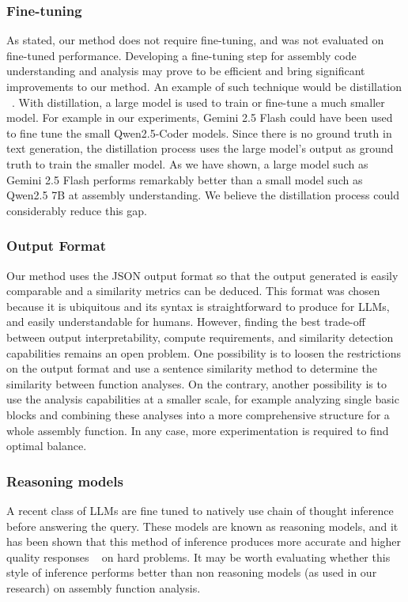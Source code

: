 \subsubsection{Fine-tuning}

As stated, our method does not require fine-tuning, and was not evaluated on fine-tuned performance. Developing a fine-tuning step
for assembly code understanding and analysis may prove to be efficient and bring significant improvements to our method.
An example of such technique would be distillation ~\cite{distillation}. With distillation, a large model is used to train or fine-tune a
much smaller model. For example in our experiments, Gemini 2.5 Flash could have been used to fine tune the small Qwen2.5-Coder models.
Since there is no ground truth in text generation, the distillation process uses the large model's output as ground truth
to train the smaller model. As we have shown, a large model such as Gemini 2.5 Flash performs remarkably better than a
small model such as Qwen2.5 7B at assembly understanding. We believe the distillation process could considerably reduce this gap.

\subsubsection{Output Format}

Our method uses the JSON output format so that the output generated is easily comparable and a similarity metrics can be deduced.
This format was chosen because it is ubiquitous and its syntax is straightforward to produce for LLMs, and easily understandable for humans.
However, finding the best trade-off between output interpretability, compute requirements, and similarity detection capabilities remains
an open problem. One possibility is to loosen the restrictions on the output format and use a sentence similarity method to determine
the similarity between function analyses. On the contrary, another possibility is to use the analysis capabilities at a smaller scale,
for example analyzing single basic blocks and combining these analyses into a more comprehensive structure for a whole assembly function.
In any case, more experimentation is required to find optimal balance.

\subsubsection{Reasoning models}

A recent class of LLMs are fine tuned to natively use chain of thought inference ~\cite{c-o-t} before answering the query.
These models are known as reasoning models, and it has been shown that this method of inference produces more accurate and
higher quality responses ~\cite{c-o-t,reasoning,thinking-llm} on hard problems. It may be worth evaluating whether this style
of inference performs better than non reasoning models (as used in our research) on assembly function analysis.

